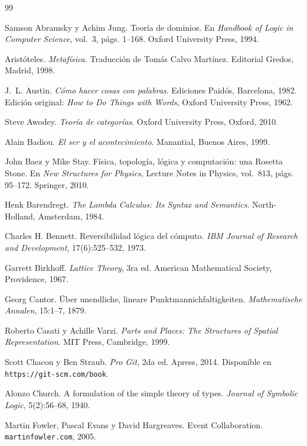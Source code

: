 \documentclass[12pt]{article}
\theoremstyle{plain}
\theoremstyle{definition}
\begin{document}
\newpage
\begin{thebibliography}{99}

Samson Abramsky y Achim Jung.
Teoría de dominios.
En \textit{Handbook of Logic in Computer Science}, vol.~3, págs. 1--168.
Oxford University Press, 1994.

Aristóteles.
\textit{Metafísica}.
Traducción de Tomás Calvo Martínez.
Editorial Gredos, Madrid, 1998.

J.~L. Austin.
\textit{Cómo hacer cosas con palabras}.
Ediciones Paidós, Barcelona, 1982.
Edición original: \textit{How to Do Things with Words}, Oxford University Press, 1962.

Steve Awodey.
\textit{Teoría de categorías}.
Oxford University Press, Oxford, 2010.

Alain Badiou.
\textit{El ser y el acontecimiento}.
Manantial, Buenos Aires, 1999.

John Baez y Mike Stay.
Física, topología, lógica y computación: una Rosetta Stone.
En \textit{New Structures for Physics}, Lecture Notes in Physics, vol.~813, págs. 95--172.
Springer, 2010.

Henk Barendregt.
\textit{The Lambda Calculus: Its Syntax and Semantics}.
North-Holland, Amsterdam, 1984.

Charles H. Bennett.
Reversibilidad lógica del cómputo.
\textit{IBM Journal of Research and Development}, 17(6):525--532, 1973.

Garrett Birkhoff.
\textit{Lattice Theory}, 3ra ed.
American Mathematical Society, Providence, 1967.

Georg Cantor.
Über unendliche, lineare Punktmannichfaltigkeiten.
\textit{Mathematische Annalen}, 15:1--7, 1879.

Roberto Casati y Achille Varzi.
\textit{Parts and Places: The Structures of Spatial Representation}.
MIT Press, Cambridge, 1999.

Scott Chacon y Ben Straub.
\textit{Pro Git}, 2da ed.
Apress, 2014.
Disponible en \texttt{https://git-scm.com/book}.

Alonzo Church.
A formulation of the simple theory of types.
\textit{Journal of Symbolic Logic}, 5(2):56--68, 1940.

Martin Fowler, Pascal Evans y David Hargreaves.
Event Collaboration.
\texttt{martinfowler.com}, 2005.


\end{thebibliography}
\end{document}
